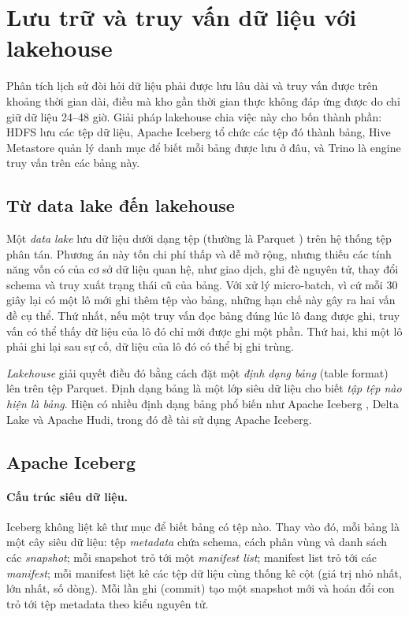 \section{Lưu trữ và truy vấn dữ liệu với lakehouse}
\label{sec:2-lakehouse}

Phân tích lịch sử đòi hỏi dữ liệu phải được lưu lâu dài và truy vấn được trên khoảng thời gian dài, điều mà kho gần thời gian thực không đáp ứng được do chỉ giữ dữ liệu 24--48 giờ. Giải pháp lakehouse chia việc này cho bốn thành phần: HDFS lưu các tệp dữ liệu, Apache Iceberg tổ chức các tệp đó thành bảng, Hive Metastore quản lý danh mục để biết mỗi bảng được lưu ở đâu, và Trino là engine truy vấn trên các bảng này.

\subsection{Từ data lake đến lakehouse}
\label{sec:2-lake-to-lakehouse}

Một \emph{data lake} lưu dữ liệu dưới dạng tệp (thường là Parquet \cite{parquet_docs}) trên hệ thống tệp phân tán. Phương án này tốn chi phí thấp và dễ mở rộng, nhưng thiếu các tính năng vốn có của cơ sở dữ liệu quan hệ, như giao dịch, ghi đè nguyên tử, thay đổi schema và truy xuất trạng thái cũ của bảng. Với xử lý micro-batch, vì cứ mỗi 30 giây lại có một lô mới ghi thêm tệp vào bảng, những hạn chế này gây ra hai vấn đề cụ thể. Thứ nhất, nếu một truy vấn đọc bảng đúng lúc lô đang được ghi, truy vấn có thể thấy dữ liệu của lô đó chỉ mới được ghi một phần. Thứ hai, khi một lô phải ghi lại sau sự cố, dữ liệu của lô đó có thể bị ghi trùng.

\emph{Lakehouse} giải quyết điều đó bằng cách đặt một \emph{định dạng bảng} (table format) lên trên tệp Parquet. Định dạng bảng là một lớp siêu dữ liệu cho biết \emph{tập tệp nào hiện là bảng}. Hiện có nhiều định dạng bảng phổ biến như Apache Iceberg \cite{iceberg_spec}, Delta Lake và Apache Hudi, trong đó đề tài sử dụng Apache Iceberg.

\subsection{Apache Iceberg}
\label{sec:2-iceberg}

\paragraph{Cấu trúc siêu dữ liệu.} Iceberg không liệt kê thư mục để biết bảng có tệp nào. Thay vào đó, mỗi bảng là một cây siêu dữ liệu: tệp \emph{metadata} chứa schema, cách phân vùng và danh sách các \emph{snapshot}; mỗi snapshot trỏ tới một \emph{manifest list}; manifest list trỏ tới các \emph{manifest}; mỗi manifest liệt kê các tệp dữ liệu cùng thống kê cột (giá trị nhỏ nhất, lớn nhất, số dòng). Mỗi lần ghi (commit) tạo một snapshot mới và hoán đổi con trỏ tới tệp metadata theo kiểu nguyên tử.


